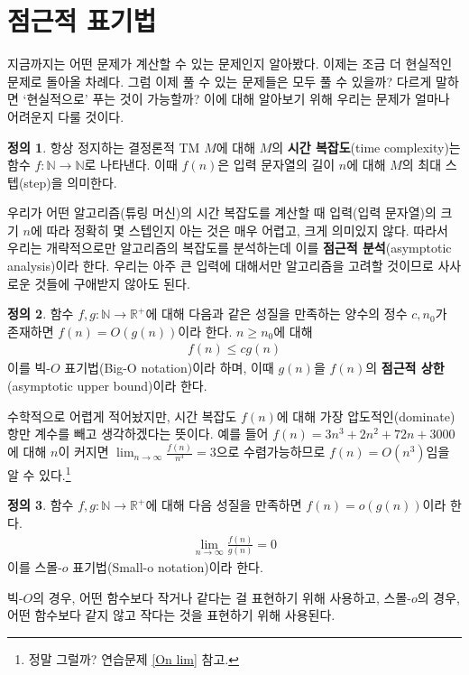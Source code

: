 \documentclass[b5paper, 11pt]{book}
\theoremstyle{definition}
\newtheorem{defn}{정의}[chapter]
\begin{document}
\section{점근적 표기법}\label{asymptotic}
지금까지는 어떤 문제가 계산할 수 있는 문제인지 알아봤다. 이제는 조금 더 현실적인 문제로 돌아올 차례다. 그럼 이제 풀 수 있는 문제들은 모두 풀 수 있을까? 다르게 말하면 `현실적으로' 푸는 것이 가능할까? 이에 대해 알아보기 위해 우리는 문제가 얼마나 어려운지 다룰 것이다.
\begin{defn}
    항상 정지하는 결정론적 TM $M$에 대해 $M$의 \textbf{시간 복잡도}(time complexity)는 함수 $f: \mathbb{N} \rightarrow \mathbb{N}$로 나타낸다. 이때 $f(n)$은 입력 문자열의 길이 $n$에 대해 $M$의 최대 스텝(step)을 의미한다.
\end{defn}
우리가 어떤 알고리즘(튜링 머신)의 시간 복잡도를 계산할 때 입력(입력 문자열)의 크기 $n$에 따라 정확히 몇 스텝인지 아는 것은 매우 어렵고, 크게 의미있지 않다. 따라서 우리는 개략적으로만 알고리즘의 복잡도를 분석하는데 이를 \textbf{점근적 분석}(asymptotic analysis)이라 한다. 우리는 아주 큰 입력에  대해서만 알고리즘을 고려할 것이므로 사사로운 것들에 구애받지 않아도 된다. 
\begin{defn} \label{big-o defn}
    함수 $f, g : \mathbb{N} \rightarrow \mathbb{R}^{+}$에 대해 다음과 같은 성질을 만족하는 양수의 정수 $c, n_0$가 존재하면 $f(n) = O(g(n))$이라 한다. $n \ge n_0$에 대해
    \begin{align*}
        f(n) \le cg(n)
    \end{align*}
    이를 빅-$O$ 표기법(Big-O notation)이라 하며, 이때 $g(n)$을 $f(n)$의 \textbf{점근적 상한} (asymptotic upper bound)이라 한다.
\end{defn}
수학적으로 어렵게 적어놨지만, 시간 복잡도 $f(n)$에 대해 가장 압도적인(dominate) 항만 계수를 빼고 생각하겠다는 뜻이다. 예를 들어 $f(n) = 3n^3 + 2n^2 +72n + 3000$에 대해 $n$이 커지면 $\lim_{n \rightarrow \infty} 
\frac{f(n)}{n^3} = 3$으로 수렴가능하므로 $f(n) = O(n^3)$임을 알 수 있다.\footnote{정말 그럴까? 연습문제 \ref{On lim} 참고.}
\begin{defn}\label{small-o defn}
    함수 $f,g : \mathbb{N} \rightarrow \mathbb{R}^{+}$에 대해 다음 성질을 만족하면 $f(n) = o(g(n))$이라 한다. 
    \begin{align*}
        \lim_{n\rightarrow \infty} \frac{f(n)}{g(n)} = 0
    \end{align*}
    이를 스몰-$o$ 표기법(Small-o notation)이라 한다. 
\end{defn}
빅-$O$의 경우, 어떤 함수보다 작거나 같다는 걸 표현하기 위해 사용하고, 스몰-$o$의 경우, 어떤 함수보다 같지 않고 작다는 것을 표현하기 위해 사용된다. 
\end{document}
